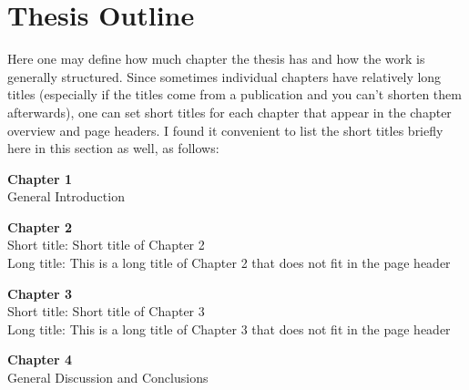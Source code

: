 \documentclass[%
a4paper,12pt,ngerman,UKenglish,twoside]{book}
\begin{document}
\cleardoublepage

\listoffigures
{}
\clearpage
\listoftables
{}
\clearpage
\listofmyequations
{}
\cleardoublepage

\chapter*{Thesis Outline}
Here one may define how much chapter the thesis has and how the work is generally structured. Since sometimes individual chapters have relatively long titles (especially if the titles come from a publication and you can't shorten them afterwards), one can set short titles for each chapter that appear in the chapter overview and page headers. I found it convenient to list the short titles briefly here in this section as well, as follows:
\par\bigskip
\begin{flushleft}
\textbf{Chapter 1}\\
General Introduction
\par\medskip
\textbf{Chapter 2}\\
Short title: Short title of Chapter 2\\
Long title: This is a long title of Chapter 2 that does not fit in the page header\\
\par\medskip
\textbf{Chapter 3}\\
Short title: Short title of Chapter 3\\
Long title: This is a long title of Chapter 3 that does not fit in the page header\\
\par\medskip
\textbf{Chapter 4}\\
General Discussion and Conclusions
\end{flushleft}

\cleardoublepage

\end{document}
